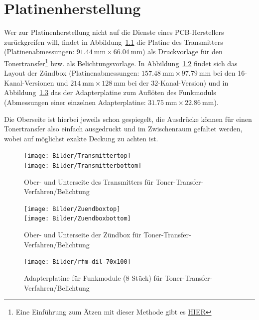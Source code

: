 \documentclass[paper=a4, parskip, numbers=noenddot, toc=listof, headsepline]{scrbook}
\begin{document}
	\chapter{Platinenherstellung}
		\label{ch:platinenherstellung}

		Wer zur Platinenherstellung nicht auf die Dienste eines PCB-Herstellers zurückgreifen will, findet in Abbildung~\ref{fig:transmitterprint} die Platine des Transmitters (Platinenabmessungen: $\SI{91,44}{\milli\metre}\times\SI{66,04}{\milli\metre}$) als Druckvorlage für den Tonertransfer\footnote{Eine Einführung zum Ätzen mit dieser Methode gibt es \href{http://thomaspfeifer.net/platinen_aetzen.htm}{HIER}} bzw. als Belichtungsvorlage. In Abbildung~\ref{fig:zuendboxprint} findet sich das Layout der Zündbox (Platinenabmessungen: $\SI{157,48}{\milli\metre}\times\SI{97,79}{\milli\metre}$ bei den 16-Kanal-Versionen und $\SI{214}{\milli\metre}\times\SI{128}{\milli\metre}$ bei der 32-Kanal-Version) und in Abbildung~\ref{fig:rfmprint} das der Adapterplatine zum Auflöten des Funkmoduls (Abmessungen einer einzelnen Adapterplatine: $\SI{31,75}{\milli\metre}\times\SI{22,86}{\milli\metre}$).

		Die Oberseite ist hierbei jeweils schon gespiegelt, die Ausdrücke können für einen Tonertransfer also einfach ausgedruckt und im Zwischenraum gefaltet werden, wobei auf möglichst exakte Deckung zu achten ist.

		\begin{figure}
			\centering
			\texttt{[image: Bilder/Transmittertop]}\vspace{5mm}\\
			\texttt{[image: Bilder/Transmitterbottom]}
			\caption{Ober- und Unterseite des Transmitters für Toner-Transfer-Verfahren/Belichtung}
			\label{fig:transmitterprint}
		\end{figure}

		\begin{figure}
			\centering
			\texttt{[image: Bilder/Zuendboxtop]}\vspace{5mm}\\
			\texttt{[image: Bilder/Zuendboxbottom]}
			\caption{Ober- und Unterseite der Zündbox für Toner-Transfer-Verfahren/Belichtung}
			\label{fig:zuendboxprint}
		\end{figure}

		\begin{figure}
			\centering
			\texttt{[image: Bilder/rfm-dil-70x100]}
			\caption{Adapterplatine für Funkmodule (8 Stück) für Toner-Transfer-Verfahren/Belichtung}
			\label{fig:rfmprint}
		\end{figure}
\end{document}
